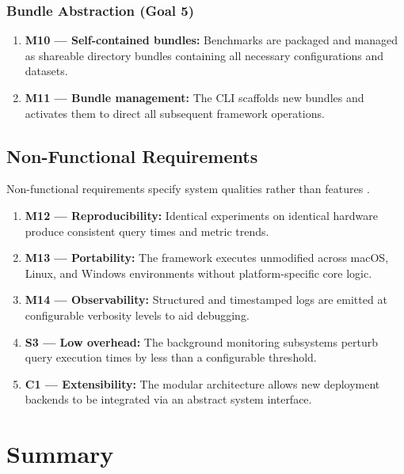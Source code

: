 \documentclass{l4proj}
\begin{document}
\subsubsection{Bundle Abstraction (Goal 5)}
\label{sec:req_bundle}

\begin{enumerate}
    \item \textbf{M10 --- Self-contained bundles:} Benchmarks are packaged and managed as shareable directory bundles containing all necessary configurations and datasets.
    \item \textbf{M11 --- Bundle management:} The CLI scaffolds new bundles and activates them to direct all subsequent framework operations.
\end{enumerate}

\subsection{Non-Functional Requirements}
\label{sec:nonfunctional_reqs}

Non-functional requirements specify system qualities rather than features \citep{rahy2022understanding}.

\begin{enumerate}
    \item \textbf{M12 --- Reproducibility:} Identical experiments on identical hardware produce consistent query times and metric trends.
    \item \textbf{M13 --- Portability:} The framework executes unmodified across macOS, Linux, and Windows environments without platform-specific core logic.
    \item \textbf{M14 --- Observability:} Structured and timestamped logs are emitted at configurable verbosity levels to aid debugging.
    \item \textbf{S3 --- Low overhead:} The background monitoring subsystems perturb query execution times by less than a configurable threshold.
    \item \textbf{C1 --- Extensibility:} The modular architecture allows new deployment backends to be integrated via an abstract system interface.
\end{enumerate}


\section{Summary}
\label{sec:req_summary}
\end{document}

